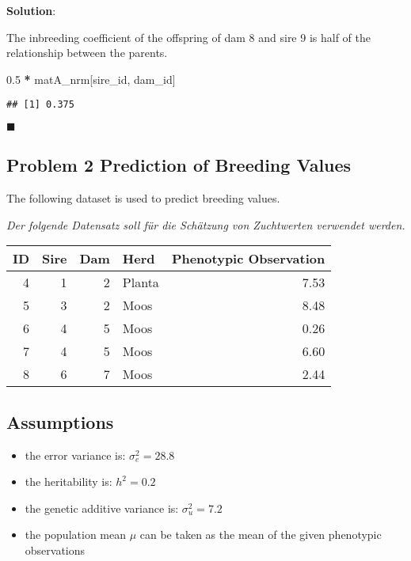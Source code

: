 \documentclass[
]{article}
\newenvironment{Shaded}{\begin{snugshade}}{\end{snugshade}}
\newcommand{\FloatTok}[1]{\textcolor[rgb]{0.00,0.00,0.81}{#1}}
\newcommand{\NormalTok}[1]{#1}
\newcommand{\OperatorTok}[1]{\textcolor[rgb]{0.81,0.36,0.00}{\textbf{#1}}}
\newcommand{\StringTok}[1]{\textcolor[rgb]{0.31,0.60,0.02}{#1}}
\providecommand{\tightlist}{%
  \setlength{\itemsep}{0pt}\setlength{\parskip}{0pt}}
\newcommand{\solstart}
{\vspace{3ex}\textbf{Solution}:}
\newcommand{\solend}
{\vspace{2ex}$\blacksquare$}
\begin{document}
\solstart

The inbreeding coefficient of the offspring of dam 8 and sire 9 is half
of the relationship between the parents.

\begin{Shaded}
\begin{Highlighting}[]
\FloatTok{0.5} \OperatorTok{*}\StringTok{ }\NormalTok{matA_nrm[sire_id, dam_id]}
\end{Highlighting}
\end{Shaded}

\begin{verbatim}
## [1] 0.375
\end{verbatim}

\solend

\clearpage
\pagebreak

\hypertarget{problem-2-prediction-of-breeding-values}{%
\subsection{Problem 2 Prediction of Breeding
Values}\label{problem-2-prediction-of-breeding-values}}

The following dataset is used to predict breeding values.

\textit{Der folgende Datensatz soll für die Schätzung von Zuchtwerten verwendet werden.}

\begin{tabular}{rrrlr}
\toprule
ID & Sire & Dam & Herd & Phenotypic Observation\\
\midrule
4 & 1 & 2 & Planta & 7.53\\
5 & 3 & 2 & Moos & 8.48\\
6 & 4 & 5 & Moos & 0.26\\
7 & 4 & 5 & Moos & 6.60\\
8 & 6 & 7 & Moos & 2.44\\
\bottomrule
\end{tabular}

\hypertarget{assumptions}{%
\subsection{Assumptions}\label{assumptions}}

\begin{itemize}
\tightlist
\item
  the error variance is: \(\sigma_e^2 = 28.8\)
\item
  the heritability is: \(h^2 = 0.2\)
\item
  the genetic additive variance is: \(\sigma_u^2 = 7.2\)
\item
  the population mean \(\mu\) can be taken as the mean of the given
  phenotypic observations
\end{itemize}
\end{document}
